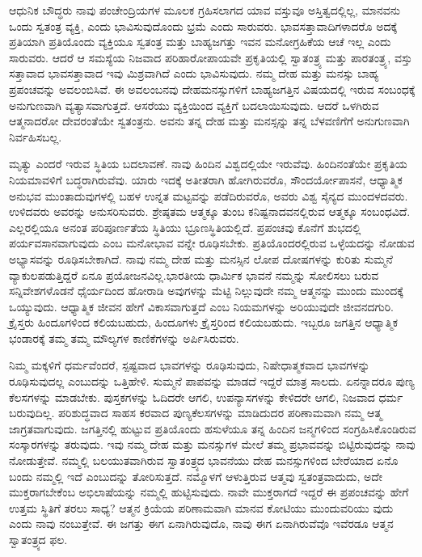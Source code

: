 ಆಧುನಿಕ ಬೌದ್ಧರು ನಾವು ಪಂಚೇಂದ್ರಿಯಗಳ ಮೂಲಕ ಗ್ರಹಿಸಲಾಗದ ಯಾವ ವಸ್ತುವೂ ಅಸ್ತಿತ್ವದಲ್ಲಿಲ್ಲ, ಮಾನವನು ಒಂದು ಸ್ವತಂತ್ರ ವ್ಯಕ್ತಿ, ಎಂದು ಭಾವಿಸುವುದೊಂದು ಭ್ರಮೆ ಎಂದು ಸಾರುವರು. ಭಾವಸತ್ತಾವಾದಿಗಳಾದರೊ  ಅದಕ್ಕೆ ಪ್ರತಿಯಾಗಿ ಪ್ರತಿಯೊಂದು ವ್ಯಕ್ತಿಯೂ ಸ್ವತಂತ್ರ ಮತ್ತು ಬಾಹ್ಯಜಗತ್ತು ಇವನ ಮನೋಗ್ರಹಿಕೆಯ ಆಚೆ ಇಲ್ಲ ಎಂದು ಸಾರುವರು. ಆದರೆ ಆ ಸಮಸ್ಯೆಯ ನಿಜವಾದ ಪರಿಹಾರೋಪಾಯವೇ ಪ್ರಕೃತಿಯಲ್ಲಿ ಸ್ವಾತಂತ್ರ್ಯ ಮತ್ತು ಪಾರತಂತ್ರ್ಯ, ವಸ್ತು ಸತ್ತಾವಾದ ಭಾವಸತ್ತಾವಾದ ಇವು ಮಿಶ್ರವಾಗಿದೆ ಎಂದು ಭಾವಿಸುವುದು. ನಮ್ಮ ದೇಹ ಮತ್ತು ಮನಸ್ಸು ಬಾಹ್ಯ ಪ್ರಪಂಚವನ್ನು ಅವಲಂಬಿಸಿವೆ. ಈ ಅವಲಂಬನವು ದೇಹಮನಸ್ಸುಗಳಿಗೆ ಬಾಹ್ಯಜಗತ್ತಿನ ವಿಷಯದಲ್ಲಿ ಇರುವ ಸಂಬಂಧಕ್ಕೆ ಅನುಗುಣವಾಗಿ ವ್ಯತ್ಯಾಸವಾಗುತ್ತದೆ. ಆಸರೆಯು ವ್ಯಕ್ತಿಯಿಂದ ವ್ಯಕ್ತಿಗೆ ಬದಲಾಯಿಸುವುದು. ಆದರೆ ಒಳಗಿರುವ ಆತ್ಮನಾದರೋ ದೇವರಂತೆಯೇ ಸ್ವತಂತ್ರನು. ಅವನು ತನ್ನ ದೇಹ ಮತ್ತು ಮನಸ್ಸನ್ನು ತನ್ನ ಬೆಳವಣಿಗೆಗೆ ಅನುಗುಣವಾಗಿ ನಿರ್ವಹಿಸಬಲ್ಲ.

ಮೃತ್ಯು ಎಂದರೆ ಇರುವ ಸ್ಥಿತಿಯ ಬದಲಾವಣೆ. ನಾವು ಹಿಂದಿನ ವಿಶ್ವದಲ್ಲಿಯೇ ಇರುವೆವು. ಹಿಂದಿನಂತೆಯೇ ಪ್ರಕೃತಿಯ ನಿಯಮಾವಳಿಗೆ ಬದ್ಧರಾಗಿರುವೆವು. ಯಾರು ಇದಕ್ಕೆ ಅತೀತರಾಗಿ ಹೋಗಿರುವರೊ, ಸೌಂದರ್ಯೋಪಾಸನೆ, ಆಧ್ಯಾತ್ಮಿಕ ಅನುಭವ ಮುಂತಾದುವುಗಳಲ್ಲಿ ಬಹಳ ಉನ್ನತ ಮಟ್ಟವನ್ನು ಪಡೆದಿರುವರೊ, ಅವರು ವಿಶ್ವ ಸೈನ್ಯದ ಮುಂದಳದವರು. ಉಳಿದವರು ಅವರನ್ನು ಅನುಸರಿಸುವರು. ಶ್ರೇಷ್ಠತಮ ಆತ್ಮಕ್ಕೂ ತುಂಬ ಕನಿಷ್ಟನಾದವನಲ್ಲಿರುವ ಆತ್ಮಕ್ಕೂ ಸಂಬಂಧವಿದೆ. ಎಲ್ಲರಲ್ಲಿಯೂ ಅನಂತ ಪರಿಪೂರ್ಣತೆಯ ಸ್ಥಿತಿಯು ಭ್ರೂಣಸ್ಥಿತಿಯಲ್ಲಿದೆ. ಪ್ರಪಂಚವು ಕೊನೆಗೆ ಶುಭದಲ್ಲಿ ಪರ್ಯವಸಾನವಾಗುವುದು ಎಂಬ ಮನೋಭಾವ ವನ್ನೇ ರೂಢಿಸಬೇಕು. ಪ್ರತಿಯೊಂದರಲ್ಲಿರುವ ಒಳ್ಳೆಯದನ್ನು ನೋಡುವ ಅಭ್ಯಾಸವನ್ನು ರೂಢಿಸಬೇಕಾಗಿದೆ. ನಾವು ನಮ್ಮ ದೇಹ ಮತ್ತು ಮನಸ್ಸಿನ ಲೋಪ ದೋಷಗಳನ್ನು ಕುರಿತು ಸುಮ್ಮನೆ ವ್ಯಾಕುಲಪಡುತ್ತಿದ್ದರೆ ಏನೂ ಪ್ರಯೋಜನವಿಲ್ಲ.ಭಾರತೀಯ ಧಾರ್ಮಿಕ ಭಾವನೆ
 ನಮ್ಮನ್ನು ಸೋಲಿಸಲು ಬರುವ ಸನ್ನಿವೇಶಗಳೊಡನೆ ಧೈರ್ಯದಿಂದ ಹೋರಾಡಿ ಅವುಗಳನ್ನು ಮೆಟ್ಟಿ ನಿಲ್ಲುವುದೇ ನಮ್ಮ ಆತ್ಮನನ್ನು ಮುಂದು ಮುಂದಕ್ಕೆ ಒಯ್ಯುವುದು. ಆಧ್ಯಾತ್ಮಿಕ ಜೀವನ ಹೇಗೆ ವಿಕಾಸವಾಗುತ್ತದೆ ಎಂಬ ನಿಯಮಗಳನ್ನು ಅರಿಯುವುದೇ ಜೀವನದಗುರಿ. ಕ್ರೈಸ್ತರು ಹಿಂದೂಗಳಿಂದ ಕಲಿಯಬಹುದು, ಹಿಂದೂಗಳು ಕ್ರೈಸ್ತರಿಂದ ಕಲಿಯಬಹುದು. ಇಬ್ಬರೂ ಜಗತ್ತಿನ ಆಧ್ಯಾತ್ಮಿಕ ಭಂಡಾರಕ್ಕೆ ತಮ್ಮ ತಮ್ಮ ಮೌಲ್ಯಗಳ ಕಾಣಿಕೆಗಳನ್ನು ಅರ್ಪಿಸಿರುವರು.

ನಿಮ್ಮ ಮಕ್ಕಳಿಗೆ ಧರ್ಮವೆಂದರೆ, ಸ್ಪಷ್ಟವಾದ ಭಾವಗಳನ್ನು ರೂಢಿಸುವುದು, ನಿಷೇಧಾತ್ಮಕವಾದ ಭಾವಗಳನ್ನು ರೂಢಿಸುವುದಲ್ಲ ಎಂಬುದನ್ನು ಒತ್ತಿಹೇಳಿ. ಸುಮ್ಮನೆ ಪಾಪವನ್ನು ಮಾಡದೆ ಇದ್ದರೆ ಮಾತ್ರ ಸಾಲದು. ಏನನ್ನಾದರೂ ಪುಣ್ಯ ಕೆಲಸಗಳನ್ನು ಮಾಡಬೇಕು. ಪುಸ್ತಕಗಳನ್ನು ಓದಿದರೇ ಆಗಲಿ, ಉಪನ್ಯಾಸಗಳನ್ನು ಕೇಳಿದರೇ ಆಗಲಿ, ನಿಜವಾದ ಧರ್ಮ ಬರುವುದಿಲ್ಲ. ಪರಿಶುದ್ಧವಾದ ಸಾಹಸ ಕರವಾದ ಪುಣ್ಯಕೆಲಸಗಳನ್ನು ಮಾಡಿದುದರ ಪರಿಣಾಮವಾಗಿ ನಮ್ಮ ಆತ್ಮ ಜಾಗ್ರತವಾಗುವುದು. ಜಗತ್ತಿನಲ್ಲಿ ಹುಟ್ಟುವ ಪ್ರತಿಯೊಂದು ಹಸುಳೆಯೂ ತನ್ನ ಹಿಂದಿನ ಜನ್ಮಗಳಿಂದ ಸಂಗ್ರಹಿಸಿಕೊಂಡಿರುವ ಸಂಸ್ಕಾರಗಳನ್ನು ತರುವುದು. ಇವು ನಮ್ಮ ದೇಹ ಮತ್ತು ಮನಸ್ಸುಗಳ ಮೇಲೆ ತಮ್ಮ ಪ್ರಭಾವವನ್ನು ಬಿಟ್ಟಿರುವುದನ್ನು ನಾವು ನೋಡುತ್ತೇವೆ. ನಮ್ಮಲ್ಲಿ ಬಲಯುತವಾಗಿರುವ ಸ್ವಾತಂತ್ರ್ಯದ ಭಾವನೆಯು ದೇಹ ಮನಸ್ಸುಗಳಿಂದ ಬೇರೆಯಾದ ಏನೊ ಬಂದು ನಮ್ಮಲ್ಲಿ ಇದೆ ಎಂಬುದನ್ನು ತೋರಿಸುತ್ತದೆ. ನಮ್ಮೊಳಗೆ ಆಳುತ್ತಿರುವ ಆತ್ಮವು ಸ್ವತಂತ್ರವಾದುದು, ಅದೇ ಮುಕ್ತರಾಗಬೇಕೆಂಬ ಅಭಿಲಾಷೆಯನ್ನು ನಮ್ಮಲ್ಲಿ ಹುಟ್ಟಿಸುವುದು. ನಾವೇ ಮುಕ್ತರಾಗದೆ ಇದ್ದರೆ ಈ ಪ್ರಪಂಚವನ್ನು ಹೇಗೆ ಉತ್ತಮ ಸ್ಥಿತಿಗೆ ತರಲು ಸಾಧ್ಯ? ಆತ್ಮನ ಕ್ರಿಯೆಯ ಪರಿಣಾಮವಾಗಿ ಮಾನವ ಕೋಟಿಯು ಮುಂದುವರಿಯು ವುದು ಎಂದು ನಾವು ನಂಬುತ್ತೇವೆ. ಈ ಜಗತ್ತು ಈಗ ಏನಾಗಿರುವುದೊ, ನಾವು ಈಗ ಏನಾಗಿರುವೆವೊ ಇವೆರಡೂ ಆತ್ಮನ ಸ್ವಾತಂತ್ರ್ಯದ ಫಲ.


